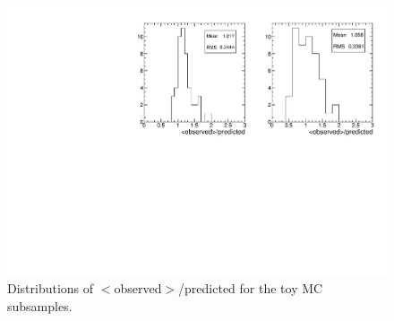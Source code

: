 \begin{figure}[tbh]
\begin{center}
\includegraphics[width=1\linewidth]{plots/abcdprime_toy.pdf}
\caption{\label{fig:abcdtoy}\protect 
Distributions of $<$observed$>$/predicted for the toy MC subsamples.
}
\end{center}
\end{figure}


